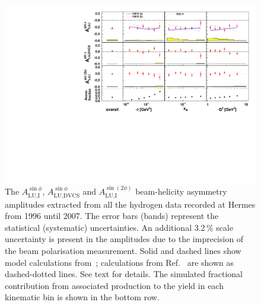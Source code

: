 \begin{figure}
 \begin{center}
 \includegraphics[width=15cm]{bsadvcsplots_eml_par13_bin6_release_all_pic_cluster_dual_update_1.pdf}
  \caption{The $A_{\textrm{LU,I}}^{\sin\phi}$, $A_{\textrm{LU,DVCS}}^{\sin\phi}$ and
$A_{\textrm{LU,I}}^{\sin(2\phi)}$ beam-helicity asymmetry amplitudes extracted from all the hydrogen data recorded at H{\sc ermes}
from 1996 until 2007. The error bars (bands) represent the statistical
(systematic) uncertainties. An additional 3.2\,\% scale uncertainty is present in the amplitudes due to the imprecision of
the beam polarisation measurement. Solid and dashed lines show model calculations from~\cite{Kum09}; calculations from Ref.~\cite{Liu11} are shown as dashed-dotted lines. See text for details. The simulated fractional contribution from associated production to the yield in each kinematic bin is shown in the bottom row.}
  \label{bsa_xbjrange}
 \end{center}
\end{figure}

